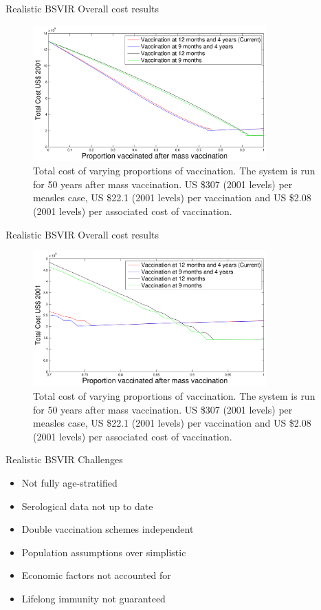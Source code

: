 \documentclass{beamer}
\begin{document}
\begin{frame} {Realistic BSVIR} {Overall cost results}
\begin{figure}
\centering
\includegraphics[width=90mm]{figproportionrealisticBSVIRcomparison0to100}
\caption{Total cost of varying proportions of vaccination. The system is run for 50 years after mass vaccination. US \$307 (2001 levels) per measles case, US \$22.1 (2001 levels) per vaccination and US \$2.08 (2001 levels) per associated cost of vaccination.}
\end{figure}
\end{frame}

\begin{frame} {Realistic BSVIR} {Overall cost results}
\begin{figure}
\centering
\includegraphics[width=90mm]{figproportionrealisticBSVIRcomparison70to100}
\caption{Total cost of varying proportions of vaccination. The system is run for 50 years after mass vaccination. US \$307 (2001 levels) per measles case, US \$22.1 (2001 levels) per vaccination and US \$2.08 (2001 levels) per associated cost of vaccination.}
\end{figure}
\end{frame}

\begin{frame} {Realistic BSVIR} {Challenges}
\begin{itemize}
\item{Not fully age-stratified}
 \item{Serological data not up to date}
 \item{Double vaccination schemes independent}
 \item{Population assumptions over simplistic}
 \item{Economic factors not accounted for}
 \item{Lifelong immunity not guaranteed}
\end{itemize}
\end{frame}
\end{document}

